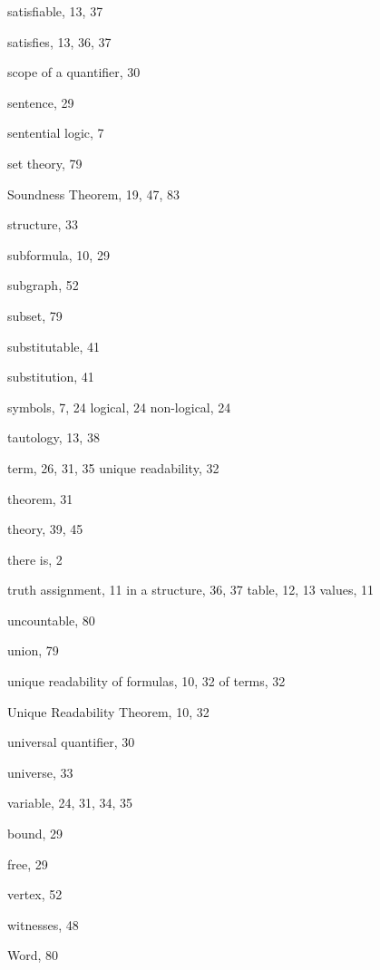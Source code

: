 \documentclass[12pt]{amsbook}
\theoremstyle{plain}
\theoremstyle{definition}
\theoremstyle{remark}
\begin{document}
\begin{theindex}
  \item satisfiable, 13, 37
  \item satisfies, 13, 36, 37
  \item scope of a quantifier, 30
  \item sentence, 29
  \item sentential logic, 7
  \item set theory, 79
  \item Soundness Theorem, 19, 47, 83
  \item structure, 33
  \item subformula, 10, 29
  \item subgraph, 52
  \item subset, 79
  \item substitutable, 41
  \item substitution, 41
  \item symbols, 7, 24
    \subitem logical, 24
    \subitem non-logical, 24

  \indexspace

  \item tautology, 13, 38
  \item term, 26, 31, 35
    \subitem unique readability, 32
  \item theorem, 31
  \item theory, 39, 45
  \item there is, 2
  \item truth 
    \subitem assignment, 11
    \subitem in a structure, 36, 37
    \subitem table, 12, 13
    \subitem values, 11

  \indexspace

  \item uncountable, 80
  \item union, 79
  \item unique readability 
    \subitem of formulas, 10, 32
    \subitem of terms, 32
  \item Unique Readability Theorem, 10, 32
  \item universal quantifier, 30
  \item universe, 33

  \indexspace

  \item variable, 24, 31, 34, 35
    \item bound, 29
    \item free, 29
  \item vertex, 52

  \indexspace

  \item witnesses, 48
  \item Word, 80

\end{theindex}
\end{document}
